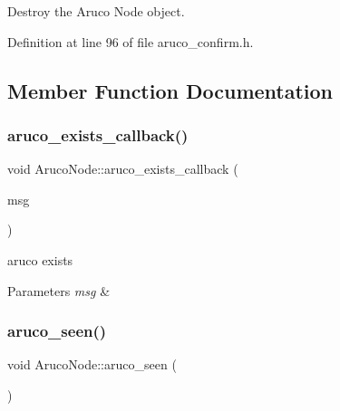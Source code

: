 Destroy the Aruco Node object. 



Definition at line 96 of file aruco\+\_\+confirm.\+h.



\subsection{Member Function Documentation}
\mbox{\label{class_aruco_node_a38f5977cae0f0cc0d30449db22b2e9d6}} 
\subsubsection{\texorpdfstring{aruco\+\_\+exists\+\_\+callback()}{aruco\_exists\_callback()}}
{\footnotesize\ttfamily void Aruco\+Node\+::aruco\+\_\+exists\+\_\+callback (\begin{DoxyParamCaption}\item[{const fiducial\+\_\+msgs\+::\+Fiducial\+Transform\+Array\+::\+Const\+Ptr \&}]{msg }\end{DoxyParamCaption})}



aruco exists 


\begin{DoxyParams}{Parameters}
{\em msg} & \\
\hline
\end{DoxyParams}
\mbox{\label{class_aruco_node_a21fe5af1a16e884424a4065ca6dd608f}} 
\subsubsection{\texorpdfstring{aruco\+\_\+seen()}{aruco\_seen()}}
{\footnotesize\ttfamily void Aruco\+Node\+::aruco\+\_\+seen (\begin{DoxyParamCaption}{ }\end{DoxyParamCaption})}

\mbox{\label{class_aruco_node_af68c583d73a36c483d28b96a6fd22713}} 
